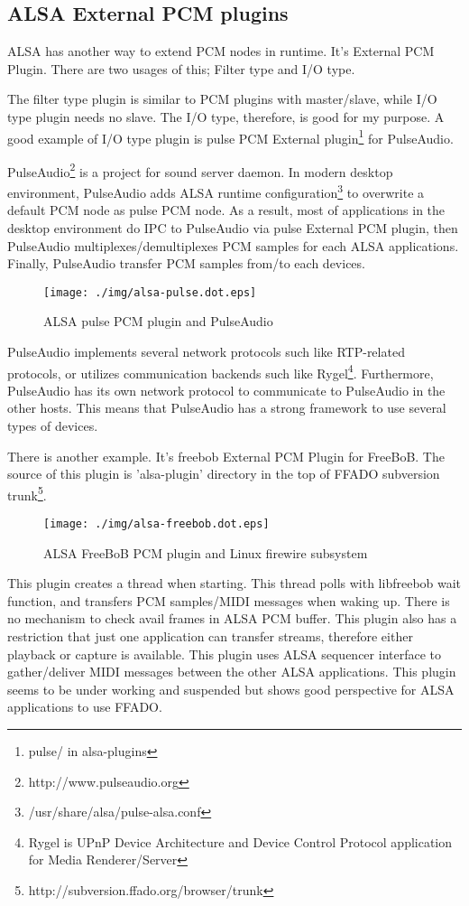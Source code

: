 \documentclass[onecolumn]{article}
\begin{document}
\subsection{ALSA External PCM plugins}
ALSA has another way to extend PCM nodes in runtime. It's External PCM Plugin\cite{alsa-lib}. There are two usages of this; Filter type and I/O type.

The filter type plugin is similar to PCM plugins with master/slave, while I/O type plugin needs no slave. The I/O type, therefore, is good for my purpose. A good example of I/O type plugin is pulse PCM External plugin\footnote{pulse/ in alsa-plugins} for PulseAudio.

PulseAudio\footnote{http://www.pulseaudio.org} is a project for sound server daemon. In modern desktop environment, PulseAudio adds ALSA runtime configuration\footnote{/usr/share/alsa/pulse-alsa.conf} to overwrite a default PCM node as pulse PCM node. As a result, most of applications in the desktop environment do IPC to PulseAudio via pulse External PCM plugin, then PulseAudio multiplexes/demultiplexes PCM samples for each ALSA applications. Finally, PulseAudio transfer PCM samples from/to each devices.

\begin{figure}[H]
	\centering
	\texttt{[image: ./img/alsa-pulse.dot.eps]}
	\caption{ALSA pulse PCM plugin and PulseAudio}
	\label{alsa-pulse}
\end{figure}

PulseAudio implements several network protocols such like RTP-related protocols, or utilizes communication backends such like Rygel\footnote{Rygel is UPnP Device Architecture and Device Control Protocol application for Media Renderer/Server}. Furthermore, PulseAudio has its own network protocol to communicate to PulseAudio in the other hosts. This means that PulseAudio has a strong framework to use several types of devices.

There is another example. It's freebob External PCM Plugin for FreeBoB. The source of this plugin is 'alsa-plugin' directory in the top of FFADO subversion trunk\footnote{http://subversion.ffado.org/browser/trunk}.

\begin{figure}[H]
	\centering
	\texttt{[image: ./img/alsa-freebob.dot.eps]}
	\caption{{ALSA FreeBoB PCM plugin and Linux firewire subsystem}}
	\label{alsa_freebob}
\end{figure}

This plugin creates a thread when starting. This thread polls with libfreebob wait function, and transfers PCM samples/MIDI messages when waking up. There is no mechanism to check avail frames in ALSA PCM buffer. This plugin also has a restriction that just one application can transfer streams, therefore either playback or capture is available. This plugin uses ALSA sequencer interface to gather/deliver MIDI messages between the other ALSA applications. This plugin seems to be under working and suspended but shows good perspective for ALSA applications to use FFADO.
\end{document}
